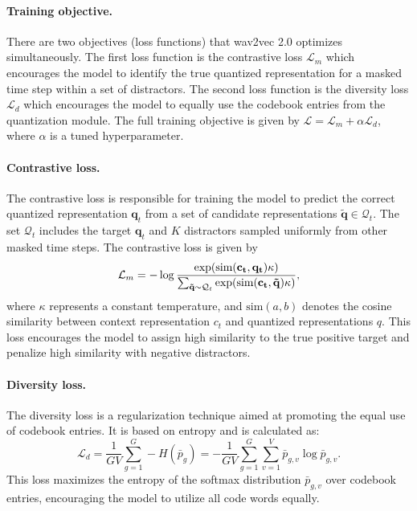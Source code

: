 \paragraph*{Training objective.} There are two objectives (loss functions) that wav2vec 2.0 optimizes simultaneously.
The first loss function is the contrastive loss $\mathcal{L}_m$ which encourages the model to
identify the true quantized representation for a masked time step within a set of distractors. 
The second loss function is the diversity loss $\mathcal{L}_d$ which encourages the model 
to equally use the codebook entries from the quantization module.
The full training objective is given by $\mathcal{L} = \mathcal{L}_m + \alpha \mathcal{L}_d$, where $\alpha$ is a tuned hyperparameter.

\paragraph*{Contrastive loss.}
The contrastive loss is responsible for training the model to predict the correct quantized 
representation $\mathbf{q}_t$ from a set of candidate representations $\mathbf{\tilde{q}} \in \mathcal{Q}_t$. 
The set $\mathcal{Q}_t$ includes the target $\mathbf{q}_t$ and $K$ distractors sampled uniformly from other masked time steps. 
The contrastive loss is given by
\begin{equation}
    \mathcal{L}_m = -\log \dfrac{\exp(\text{sim}(\mathbf{c_t}, \mathbf{q_t}) \/ \kappa)}{\sum_{\mathbf{\tilde{q}} \sim \mathcal{Q}_t} \exp(\text{sim}(\mathbf{c_t}, \mathbf{\tilde{q}}) \/ \kappa)},
\end{equation}
where $\kappa$ represents a constant temperature, and $\text{sim}(a, b)$ denotes the cosine similarity between 
context representation $c_t$ and quantized representations $q$. 
This loss encourages the model to assign high similarity to the true 
positive target and penalize high similarity with negative distractors.

\paragraph*{Diversity loss.}
The diversity loss is a regularization technique aimed at promoting the equal use of codebook entries. 
It is based on entropy and is calculated as:
\begin{equation}
    \mathcal{L}_d = \dfrac{1}{GV}\sum_{g=1}^{G} -H(\bar{p}_{g}) = -\dfrac{1}{GV}\sum_{g=1}^{G} \sum_{v=1}^{V} \bar{p}_{g,v} \log \bar{p}_{g,v}.
\end{equation}
This loss maximizes the entropy of the softmax distribution $\bar{p}_{g,v}$ over codebook entries, encouraging the model to utilize all code words equally.

